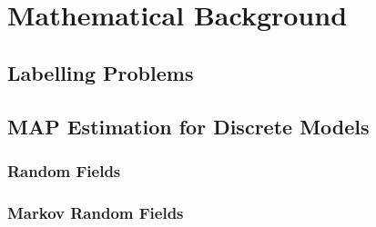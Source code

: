 
\chapter{Mathematical Background} %

\label{chap:Chapter3} %


\section{Labelling Problems}
\label{sec:LabellingProblems}


\section{MAP Estimation for Discrete Models}
\label{sec:MAPEstimates}


\subsection{Random Fields}
\label{sec:RandomFields}


\subsection{Markov Random Fields}
\label{sec:MarkovRandomFields}


